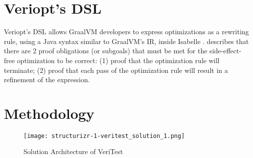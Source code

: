 \documentclass[conference,a4paper,english,10pt]{IEEEtran}[2015/08/26]
\begin{document}



\section{Veriopt's DSL}
\label{sec:dsl}

Veriopt's DSL allows GraalVM developers to express optimizations as a rewriting rule, using a Java syntax similar to GraalVM's IR, inside Isabelle 
\cite{Term_Graph_Optimizations}. \citet{Term_Graph_Optimizations} describes that there are 2 proof obligations (or subgoals) that must be met for the 
side-effect-free optimization to be correct: (1) proof that the optimization rule will terminate; (2) proof that each pass of the optimization 
rule will result in a refinement of the expression.

\section{Methodology}
\label{sec:Methodology}

\begin{figure*}
  \centering
  \texttt{[image: structurizr-1-veritest\_solution\_1.png]}
  \caption{Solution Architecture of VeriTest}
  \label{fig:architecture}
\end{figure*}
\end{document}

